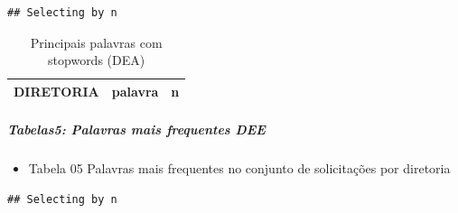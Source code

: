 \documentclass[]{article}
\newenvironment{Shaded}{\begin{snugshade}}{\end{snugshade}}
\newcommand{\DataTypeTok}[1]{\textcolor[rgb]{0.13,0.29,0.53}{#1}}
\newcommand{\DecValTok}[1]{\textcolor[rgb]{0.00,0.00,0.81}{#1}}
\newcommand{\KeywordTok}[1]{\textcolor[rgb]{0.13,0.29,0.53}{\textbf{#1}}}
\newcommand{\NormalTok}[1]{#1}
\newcommand{\OperatorTok}[1]{\textcolor[rgb]{0.81,0.36,0.00}{\textbf{#1}}}
\newcommand{\StringTok}[1]{\textcolor[rgb]{0.31,0.60,0.02}{#1}}
\providecommand{\tightlist}{%
  \setlength{\itemsep}{0pt}\setlength{\parskip}{0pt}}
\let\oldsubparagraph\subparagraph
\renewcommand{\subparagraph}[1]{\oldsubparagraph{#1}\mbox{}}
\begin{document}
\begin{verbatim}
## Selecting by n
\end{verbatim}

\begin{table}[!h]

\caption{\label{tab:unnamed-chunk-32}Principais palavras com stopwords (DEA)}
\centering
\begin{tabular}{llr}
\toprule
\rowcolor{gray!6}  DIRETORIA & palavra & n\\


\bottomrule
\end{tabular}
\end{table}

\hypertarget{tabelas5-palavras-mais-frequentes-dee}{%
\subparagraph{Tabelas5: Palavras mais frequentes
DEE}\label{tabelas5-palavras-mais-frequentes-dee}}

\begin{itemize}
\tightlist
\item
  Tabela 05 Palavras mais frequentes no conjunto de solicitações por
  diretoria
\end{itemize}

\begin{Shaded}
\end{Shaded}

\begin{verbatim}
## Selecting by n
\end{verbatim}
\end{document}
